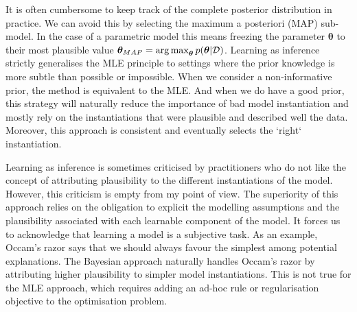 It is often cumbersome to keep track of the complete posterior distribution in practice. We can avoid this by selecting the maximum a posteriori (MAP) sub-model. In the case of a parametric model this means freezing the parameter $\bm \theta$ to their most plausible value $\bm \theta_{MAP} = \operatorname*{arg\,max}_{\bm \theta} p(\bm \theta | \mathcal{D})$. Learning as inference strictly generalises the MLE principle to settings where the prior knowledge is more subtle than possible or impossible. When we consider a non-informative prior, the method is equivalent to the MLE. And when we do have a good prior, this strategy will naturally reduce the importance of bad model instantiation and mostly rely on the instantiations that were plausible and described well the data. Moreover, this approach is consistent and eventually selects the `right` instantiation.

Learning as inference is sometimes criticised by practitioners who do not like the concept of attributing plausibility to the different instantiations of the model. However, this criticism is empty from my point of view. The superiority of this approach relies on the obligation to explicit the modelling assumptions and the plausibility associated with each learnable component of the model. It forces us to acknowledge that learning a model is a subjective task. As an example, Occam's razor says that we should always favour the simplest among potential explanations. The Bayesian approach naturally handles Occam's razor by attributing higher plausibility to simpler model instantiations. This is not true for the MLE approach, which requires adding an ad-hoc rule or regularisation objective to the optimisation problem.

%
